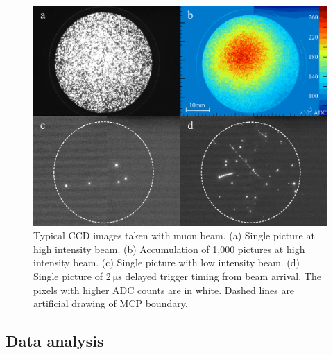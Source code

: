 \documentclass[preprint,3p,twocolumn]{elsarticle}
\begin{document}
\begin{figure}[tbp]
	\centering
	\includegraphics[width=\columnwidth]{figure/fig3_v3_number_enlarged.pdf}
	\caption{Typical CCD images taken with muon beam. (a) 
		Single picture at high intensity beam. (b)
		Accumulation of 1,000 pictures at high intensity beam. (c) Single picture
		with low intensity beam. (d)
		Single picture of $\SI{2}{\micro\s}$ delayed trigger timing from beam arrival.
        The pixels with higher ADC counts are in white. Dashed lines are artificial drawing of MCP boundary.           }
	\vspace{-0.4cm}
	\label{fig:single_cluster}
\end{figure}


\subsection{Data analysis}
\end{document}
